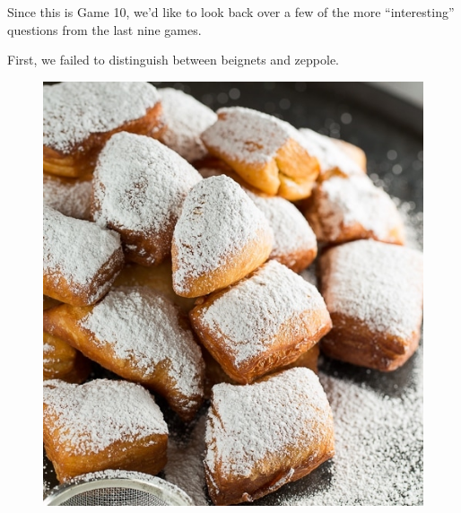 \documentclass[11pt]{beamer}
\begin{document}
\begingroup{}
\begin{frame}{}
Since this is Game 10, we'd like to look back over a few of the more ``interesting''
questions from the last nine games.
\end{frame}
\begin{frame}{}
First, we failed to distinguish between beignets and zeppole.

\begin{figure}
\captionsetup{labelformat=empty}
\centering
\begin{minipage}{.5\textwidth}
  \centering
  \includegraphics[height=.4\textheight]{Images/beignets.jpg}
\end{minipage}%
\begin{minipage}{.5\textwidth}
  \centering

\end{minipage}
\end{figure}
\end{frame}
\end{document}

